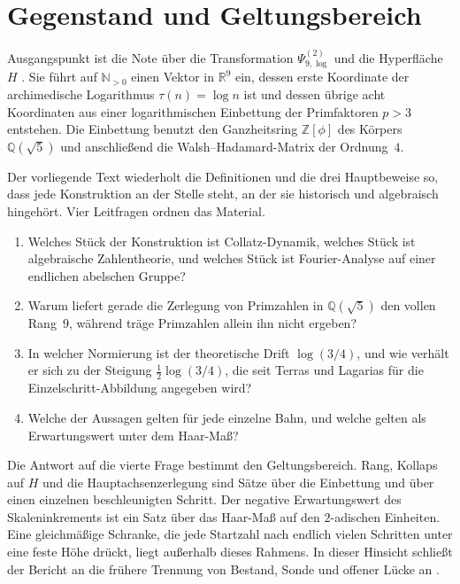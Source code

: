 \documentclass[11pt,a4paper]{article}
\theoremstyle{plain}
\theoremstyle{definition}
\newcommand{\N}{\mathbb{N}}
\newcommand{\Z}{\mathbb{Z}}
\newcommand{\Q}{\mathbb{Q}}
\newcommand{\R}{\mathbb{R}}
\numberwithin{equation}{section}
\begin{document}
\section{Gegenstand und Geltungsbereich}

Ausgangspunkt ist die Note über die Transformation $\Psi_{9,\log}^{(2)}$ und die
Hyperfläche~$H$ \cite{Psi9}.
Sie führt auf $\N_{>0}$ einen Vektor in $\R^9$ ein, dessen erste Koordinate der
archimedische Logarithmus $\tau(n)=\log n$ ist und dessen übrige acht Koordinaten
aus einer logarithmischen Einbettung der Primfaktoren $p>3$ entstehen.
Die Einbettung benutzt den Ganzheitsring $\Z[\phi]$ des Körpers $\Q(\sqrt{5})$
und anschließend die Walsh--Hadamard-Matrix der Ordnung~$4$.

Der vorliegende Text wiederholt die Definitionen und die drei Hauptbeweise so,
dass jede Konstruktion an der Stelle steht, an der sie historisch und
algebraisch hingehört.
Vier Leitfragen ordnen das Material.

\begin{enumerate}
\item Welches Stück der Konstruktion ist Collatz-Dynamik, welches Stück ist
algebraische Zahlentheorie, und welches Stück ist Fourier-Analyse auf einer
endlichen abelschen Gruppe?
\item Warum liefert gerade die Zerlegung von Primzahlen in $\Q(\sqrt{5})$ den
vollen Rang~$9$, während träge Primzahlen allein ihn nicht ergeben?
\item In welcher Normierung ist der theoretische Drift $\log(3/4)$, und wie
verhält er sich zu der Steigung $\tfrac12\log(3/4)$, die seit Terras und
Lagarias für die Einzelschritt-Abbildung angegeben wird?
\item Welche der Aussagen gelten für jede einzelne Bahn, und welche gelten als
Erwartungswert unter dem Haar-Maß?
\end{enumerate}

Die Antwort auf die vierte Frage bestimmt den Geltungsbereich.
Rang, Kollaps auf $H$ und die Hauptachsenzerlegung sind Sätze über die
Einbettung und über einen einzelnen beschleunigten Schritt.
Der negative Erwartungswert des Skaleninkrements ist ein Satz über das
Haar-Maß auf den $2$-adischen Einheiten.
Eine gleichmäßige Schranke, die jede Startzahl nach endlich vielen Schritten
unter eine feste Höhe drückt, liegt außerhalb dieses Rahmens.
In dieser Hinsicht schließt der Bericht an die frühere Trennung von Bestand,
Sonde und offener Lücke an \cite{CollatzE8}.
\end{document}
